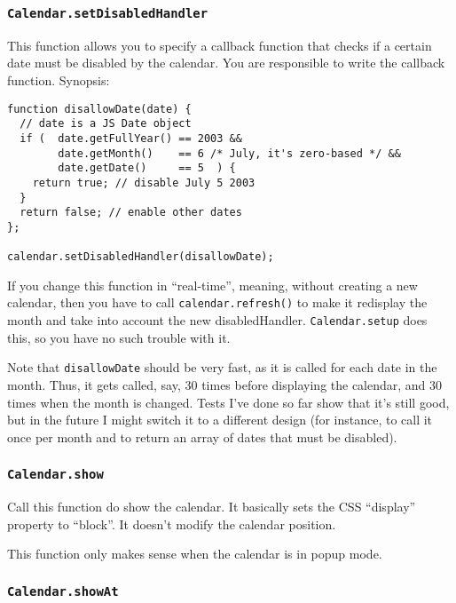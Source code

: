\documentclass[a4paper,10pt]{article}
\begin{document}
\subsubsection{\texttt{Calendar.setDisabledHandler}}\label{sec:Calendar.setDisabledHandler}

This function allows you to specify a callback function that checks if a
certain date must be disabled by the calendar.  You are responsible to write
the callback function.  Synopsis:

\begin{verbatim}
function disallowDate(date) {
  // date is a JS Date object
  if (  date.getFullYear() == 2003 &&
        date.getMonth()    == 6 /* July, it's zero-based */ &&
        date.getDate()     == 5  ) {
    return true; // disable July 5 2003
  }
  return false; // enable other dates
};

calendar.setDisabledHandler(disallowDate);
\end{verbatim}

If you change this function in ``real-time'', meaning, without creating a new
calendar, then you have to call \texttt{calendar.refresh()} to make it
redisplay the month and take into account the new disabledHandler.
\texttt{Calendar.setup} does this, so you have no such trouble with it.

Note that \texttt{disallowDate} should be very fast, as it is called for each
date in the month.  Thus, it gets called, say, 30 times before displaying the
calendar, and 30 times when the month is changed.  Tests I've done so far show
that it's still good, but in the future I might switch it to a different design
(for instance, to call it once per month and to return an array of dates that
must be disabled).

\subsubsection{\texttt{Calendar.show}}\label{sec:Calendar.show}

Call this function do show the calendar.  It basically sets the CSS ``display''
property to ``block''.  It doesn't modify the calendar position.

This function only makes sense when the calendar is in popup mode.

\subsubsection{\texttt{Calendar.showAt}}\label{sec:Calendar.showAt}
\end{document}
